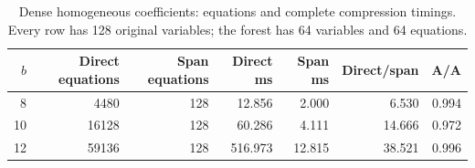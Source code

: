 \begin{table}[htbp]
\centering\small
\setlength{\tabcolsep}{4pt}
\begin{tabular}{@{}rrrrrrr@{}}
\toprule
$b$ & Direct equations & Span equations & Direct ms & Span ms & Direct/span & A/A\\\midrule
8 & 4480 & 128 & 12.856 & 2.000 & 6.530 & 0.994\\
10 & 16128 & 128 & 60.286 & 4.111 & 14.666 & 0.972\\
12 & 59136 & 128 & 516.973 & 12.815 & 38.521 & 0.996\\
\bottomrule
\end{tabular}
\caption{Dense homogeneous coefficients: equations and complete compression timings. Every row has 128 original variables; the forest has 64 variables and 64 equations.}
\label{tab:dense}
\end{table}
